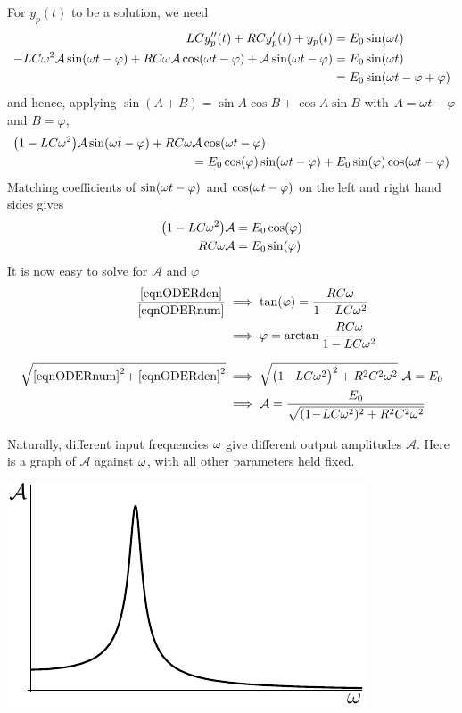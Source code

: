 \begin{eg}
\begin{itemize}
For $y_p(t)$ to be a solution, we need
\begin{align*}
LCy_p''(t)+RCy_p'(t)+y_p(t)
   &=E_0 \sin(\omega t)\\
-LC\omega^2\mathcal{A}\sin(\omega t-\varphi)+RC\omega \mathcal{A}\cos(\omega t-\varphi)
+\mathcal{A}\sin(\omega t-\varphi)
&=E_0 \sin(\omega t)\\
&=E_0 \sin(\omega t-\varphi+\varphi)
\end{align*}
and hence, applying $\sin(A+B)=\sin A\cos B+\cos A\sin B$ with $A=\omega
t-\varphi$ and $B=\varphi$,
\begin{align*}
&\big(1-LC\omega^2\big)\mathcal{A}\sin(\omega t-\varphi)+RC\omega \mathcal{A}\cos(\omega t-\varphi)
\\&\hskip2in
=E_0 \cos(\varphi)\sin(\omega t-\varphi)
+ E_0 \sin(\varphi)\cos(\omega t-\varphi)
\end{align*}
Matching coefficients of $\sin(\omega t-\varphi)$ and $\cos(\omega t-\varphi)$ on 
the left and right hand sides gives
\begin{align}
\big(1-LC\omega^2\big)\mathcal{A}&= E_0 \cos(\varphi)\label{eqnODERnum}\\
RC\omega \mathcal{A}&=E_0 \sin(\varphi)\label{eqnODERden}
\end{align}
It is now easy to solve for $\mathcal{A}$ and $\varphi$
\begin{alignat*}{3}
\frac{\eqref{eqnODERden}}{\eqref{eqnODERnum}}
&\implies \tan(\varphi) = \frac{RC\omega}{1-LC\omega^2}\\
&\implies \varphi = \arctan\frac{RC\omega}{1-LC\omega^2}\\[0.1in]
\sqrt{\eqref{eqnODERnum}^2\!+\eqref{eqnODERden}^2}
&\implies\sqrt{\big(1\!-\!LC\omega^2\big)^2+R^2C^2\omega^2}\ \mathcal{A}= E_0 \\
&\implies \mathcal{A}=\frac{E_0}{\sqrt{(1\!-\!LC\omega^2)^2+R^2C^2\omega^2}}
\end{alignat*}
\end{itemize}
Naturally, different input frequencies $\omega$ give different output 
amplitudes $\mathcal{A}$. Here is a graph of $\mathcal{A}$ against $\omega$, 
with all other parameters held fixed.
\begin{nfig}
\begin{center}
    \includegraphics{resonance.pdf}

\end{center}
\end{nfig}
\end{eg}
